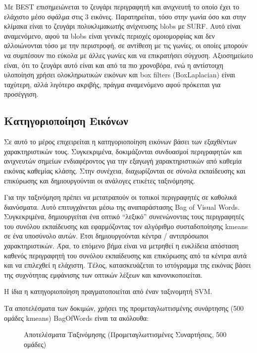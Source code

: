 \documentclass{article}
\newcommand{\eng}[1]{\foreignlanguage{english}{#1}}
\begin{document}
Με \eng{BEST} επισημειώνεται το ζευγάρι περιγραφητή και ανιχνευτή το οποίο έχει το ελάχιστο μέσο σφάλμα στις 3 εικόνες. Παρατηρείται, τόσο στην γωνία όσο και στην κλίμακα είναι το ζευγάρι πολυκλιμακωτής ανίχνευσης \eng{blobs} με \eng{SURF}. Αυτό είναι αναμενόμενο, αφού τα \eng{blobs} είναι γενικές περιοχές ομοιομορφίας και δεν αλλοιώνονται τόσο με την περιστροφή, σε αντίθεση με τις γωνίες, οι οποίες μπορούν να συμπέσουν πιο εύκολα με άλλες γωνίες και να επικρατήσει σύγχυση. Αξιοσημείωτο είναι, ότι το ζευγάρι αυτό είναι και από τα πιο χρονοβόρα, ενώ η αντίστοιχη υλοποίηση χρήσει ολοκληρωτικών εικόνων και \eng{box filters} (BoxLaplacian) είναι ταχύτερη, αλλά λιγότερο ακριβής, πράγμα αναμενόμενο αφού πρόκειται για προσέγγιση.

\subsection{Κατηγοριοποίηση Εικόνων}

Σε αυτό το μέρος επιχειρείται η κατηγοριοποίηση εικόνων βάσει των εξαχθέντων χαρακτηριστικών τους. Συγκεκριμένα, δοκιμάζονται συνδυασμοί περιγραφητών και ανιχνευτών σημείων ενδιαφέροντος για την εξαγωγή χαρακτηριστικών από καθεμία εικόνας καθεμίας κλάσης. Στην συνέχεια, διαχωρίζονται σε σύνολα εκπαίδευσης και επικύρωσης και δημιουργούνται οι ανάλογες ετικέτες ταξινόμησης. 

Για την ταξινόμηση πρέπει να μετατραπούν οι τοπικοί περιγραφητές σε καθολικά διανύσματα. Αυτό επιτυγχάνεται μέσω της αναπαράστασης \eng{Bag of Visual Words}. Συγκεκριμένα, δημιουργείται ένα οπτικό ``λεξικό'' συνενώνοντας τους περιγραφητές του συνόλου εκπαίδευσης και εφαρμόζοντας τον αλγόριθμο συσταδοποίησης \eng{kmeans} σε ένα υποσύνολο αυτών. Έτσι δημιουργούνται κέντρα / αντιπρόσωποι χαρακτηριστικών. Άρα, το επόμενο βήμα είναι να μετρηθεί η ευκλίδεια απόσταση καθενός περιγραφητή του συνόλου εκπαίδευσης και επικύρωσης από τα κέντρα αυτά και να επιλεχθεί η ελάχιστη. Τέλος, κατασκευάζεται το ιστόγραμμα της εικόνας βάσει της συχνότητας εμφάνισης των οπτικών λέξεων και κανονικοποιείται. 

Η ίδια η κατηγοριοποίηση πραγματοποιείται από έναν ταξινομητή \eng{SVM}.

Τα αποτελέσματα των δοκιμών, χρήσει της προμεταγλωττισμένης συνάρτησης (500 ομάδες \eng{kmeans}) \eng{BagOfWords} είναι τα ακόλουθα:

\begin{figure}[h]
    
    \caption{Αποτελέσματα Ταξινόμησης (Προμεταγλωττισμένες Συναρτήσεις, 500 ομάδες)}
\end{figure}
\FloatBarrier
\end{document}
